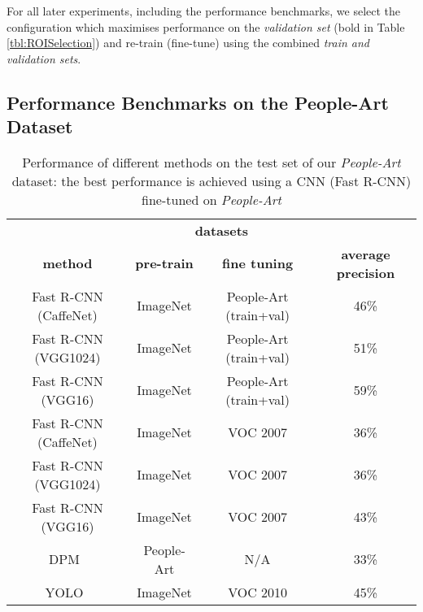 \documentclass[runningheads]{llncs}
\begin{document}
For all later experiments, including the performance benchmarks, we select the configuration which maximises performance on the \textit{validation set} (bold in Table \ref{tbl:ROISelection}) and re-train (fine-tune) using the combined \textit{train and validation sets}.


 
\subsection{Performance Benchmarks on the People-Art Dataset}
\label{sec:peopleArtBenchmarks}
\begin{table}[b]
\begin{center}
\caption{Performance of different methods on the test set of our \textit{People-Art} dataset: the best performance is achieved using a \ac{CNN} (Fast R-CNN) fine-tuned on \textit{People-Art}\label{tbl:PerformanceBenchmarks}}
\begin{tabular}{cccc}
  \hline
  & \multicolumn{2}{c}{\textbf{datasets}} & \\
  \cline{2-3}
  \textbf{method} & \textbf{pre-train} & \textbf{fine tuning} &
  \textbf{average precision} \\
  \hline
 Fast R-CNN (CaffeNet) & ImageNet & People-Art (train+val) & 46\% \\ Fast R-CNN (VGG1024) & ImageNet & People-Art (train+val) & 51\% \\ Fast R-CNN (VGG16) & ImageNet & People-Art (train+val) & 59\% \\  \hline
 Fast R-CNN (CaffeNet) & ImageNet & VOC 2007 & 36\% \\ Fast R-CNN (VGG1024) & ImageNet & VOC 2007 & 36\% \\ Fast R-CNN (VGG16) & ImageNet & VOC 2007 & 43\% \\  \hline
 DPM~\cite{felzenszwalb2010object} & People-Art & N/A & 33\% \\
 YOLO~\cite{redmon2015you} & ImageNet & VOC 2010 & 45\% \\
  \hline

  \end{tabular} \end{center}
\end{table}
\end{document}
